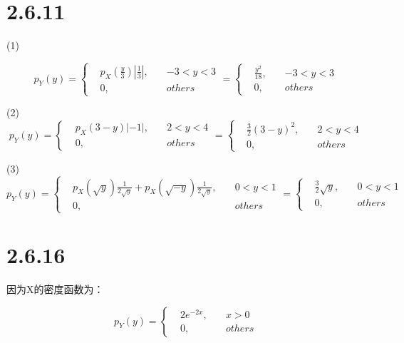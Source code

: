 \documentclass{article}
\begin{document}
\section{2.6.11}
(1)

\begin{equation}
p_Y(y)=\left\{
\begin{aligned}
&p_X(\frac{y}{3})|\frac{1}{3}|,\quad & -3<y<3 \\
&0,\quad & others
\end{aligned}
\right.
=\left\{
\begin{aligned}
&\frac{y^2}{18},\quad & -3<y<3 \\
&0,\quad & others
\end{aligned}
\right.
\end{equation}


(2)
\begin{equation}
p_Y(y)=\left\{
\begin{aligned}
&p_X(3-y)|-1|,\quad & 2<y<4 \\
&0,\quad & others
\end{aligned}
\right.
=\left\{
\begin{aligned}
&\frac 32(3-y)^2,\quad & 2<y<4 \\
&0,\quad & others
\end{aligned}
\right.
\end{equation}


(3)
\begin{equation}
p_Y(y)=\left\{
\begin{aligned}
&p_X(\sqrt y)\frac{1}{2\sqrt{y}}+p_X(\sqrt {-y})\frac{1}{2\sqrt{y}},\quad & 0<y<1 \\
&0,\quad & others
\end{aligned}
\right.
=\left\{
\begin{aligned}
&\frac 3 2 \sqrt y,\quad & 0<y<1 \\
&0,\quad & others
\end{aligned}
\right.
\end{equation}




\section{2.6.16}
因为X的密度函数为：

\begin{equation}
p_Y(y)=\left\{
\begin{aligned}
&2e^{-2x},\quad & x>0 \\
&0,\quad & others
\end{aligned}
\right.
\end{equation}
\end{document}
